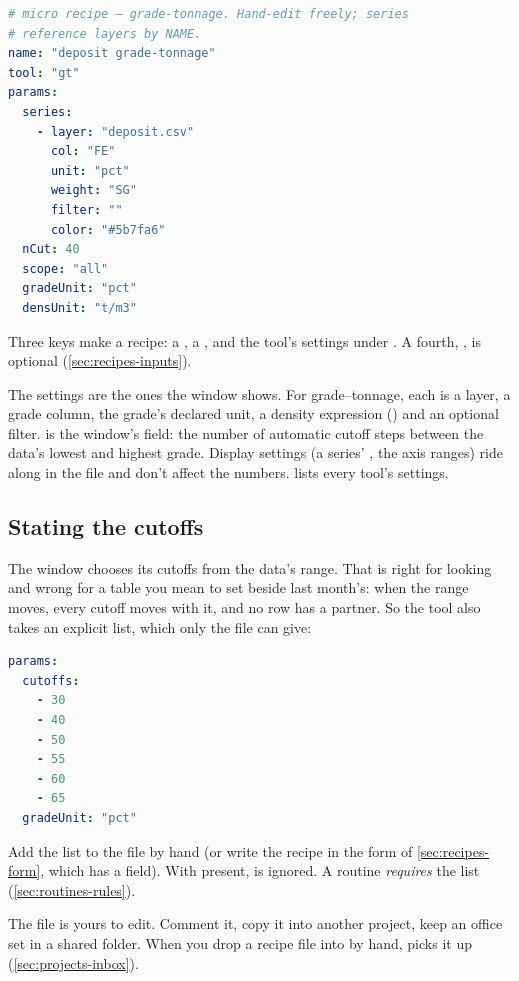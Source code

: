 \begin{lstlisting}[language=yaml]
# micro recipe — grade-tonnage. Hand-edit freely; series
# reference layers by NAME.
name: "deposit grade-tonnage"
tool: "gt"
params:
  series:
    - layer: "deposit.csv"
      col: "FE"
      unit: "pct"
      weight: "SG"
      filter: ""
      color: "#5b7fa6"
  nCut: 40
  scope: "all"
  gradeUnit: "pct"
  densUnit: "t/m3"
\end{lstlisting}

Three keys make a recipe: a , a , and the tool's settings under . A fourth, , is optional (\cref{sec:recipes-inputs}).

The settings are the ones the window shows. For grade–tonnage, each  is a layer, a grade column, the grade's declared unit, a density expression () and an optional filter.  is the window's  field: the number of automatic cutoff steps between the data's lowest and highest grade. Display settings (a series' , the axis ranges) ride along in the file and don't affect the numbers.  lists every tool's settings.

\subsection{Stating the cutoffs}\label{sec:recipes-cutoffs}
The window chooses its cutoffs from the data's range. That is right for looking and wrong for a table you mean to set beside last month's: when the range moves, every cutoff moves with it, and no row has a partner. So the tool also takes an explicit list, which only the file can give:

\begin{lstlisting}[language=yaml]
params:
  cutoffs:
    - 30
    - 40
    - 50
    - 55
    - 60
    - 65
  gradeUnit: "pct"
\end{lstlisting}

Add the list to the file by hand (or write the recipe in the form of \cref{sec:recipes-form}, which has a  field). With  present,  is ignored. A routine \emph{requires} the list (\cref{sec:routines-rules}).

The file is yours to edit. Comment it, copy it into another project, keep an office set in a shared folder. When you drop a recipe file into  by hand,  picks it up (\cref{sec:projects-inbox}).


